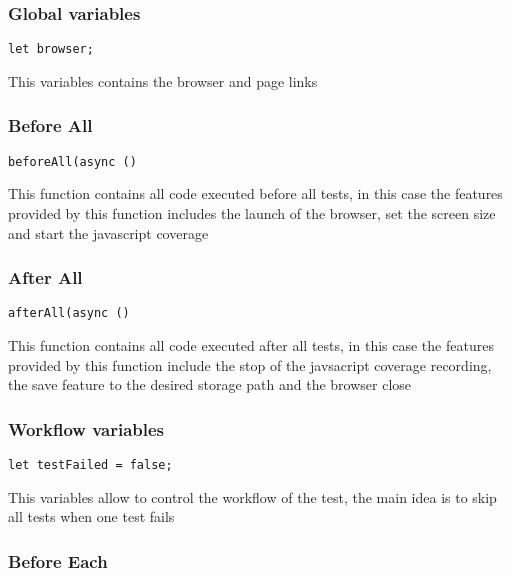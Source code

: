 \documentclass[a4paper]{article}
\begin{document}
\hypertarget{toc263}{}
\subsubsection{Global variables}

\begin{lstlisting}
let browser;
\end{lstlisting}

This variables contains the browser and page links

\hypertarget{toc264}{}
\subsubsection{Before All}

\begin{lstlisting}
beforeAll(async ()
\end{lstlisting}

This function contains all code executed before all tests, in this case the
features provided by this function includes the launch of the browser, set
the screen size and start the javascript coverage

\hypertarget{toc265}{}
\subsubsection{After All}

\begin{lstlisting}
afterAll(async ()
\end{lstlisting}

This function contains all code executed after all tests, in this case the
features provided by this function include the stop of the javsacript coverage
recording, the save feature to the desired storage path and the browser close

\hypertarget{toc266}{}
\subsubsection{Workflow variables}

\begin{lstlisting}
let testFailed = false;
\end{lstlisting}

This variables allow to control the workflow of the test, the main idea is to
skip all tests when one test fails

\hypertarget{toc267}{}
\subsubsection{Before Each}
\end{document}
